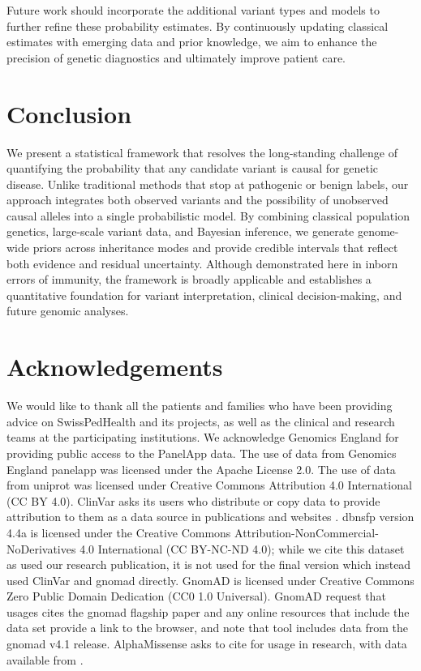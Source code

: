 Future work should incorporate the additional variant types and models to further refine these probability estimates. 
By continuously updating classical estimates with emerging data and prior knowledge, we aim to enhance the precision of genetic diagnostics and ultimately improve patient care.

\clearpage
\section{Conclusion}
We present a statistical framework that resolves the long-standing challenge of quantifying the probability that any candidate variant is causal for genetic disease. Unlike traditional methods that stop at pathogenic or benign labels, our approach integrates both observed variants and the possibility of unobserved causal alleles into a single probabilistic model. By combining classical population genetics, large-scale variant data, and Bayesian inference, we generate genome-wide priors across inheritance modes and provide credible intervals that reflect both evidence and residual uncertainty. Although demonstrated here in inborn errors of immunity, the framework is broadly applicable and establishes a quantitative foundation for variant interpretation, clinical decision-making, and future genomic analyses.

\section*{Acknowledgements}
\noindent
We would like to thank all the patients and families who have been providing advice on SwissPedHealth and its projects, as well as the clinical and research teams at the participating institutions.
We acknowledge Genomics England for providing public access to the PanelApp data.
The use of data from Genomics England panelapp was licensed under the Apache License 2.0.
The use of data from \ac{uniprot} was licensed under Creative Commons Attribution 4.0 International (CC BY 4.0).
ClinVar asks its users who distribute or copy data to provide attribution to them as a data source in publications and websites \cite{landrum_clinvar_2018}.
\ac{dbnsfp} version 4.4a is licensed under the Creative Commons Attribution-NonCommercial-NoDerivatives 4.0 International (CC BY-NC-ND 4.0); while we cite this dataset as used our research publication, it is not used for the final version which instead used ClinVar and \ac{gnomad} directly.
GnomAD is licensed under  Creative Commons  Zero Public Domain Dedication (CC0 1.0 Universal).
GnomAD request that usages cites the \ac{gnomad} flagship paper \cite{karczewski2020mutational}
and any online resources that include the data set provide a link to the browser, and note that tool includes data from the \ac{gnomad} v4.1 release.
AlphaMissense asks to cite \citet{cheng_accurate_2023} for usage in research, with data available from \citet{jun_cheng_2023_8208688}.


